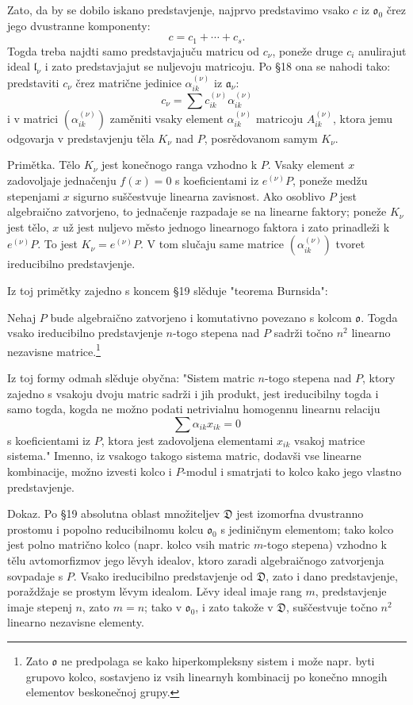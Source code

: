 \documentclass[11pt]{article}
\providecommand{\mo}{\mathfrak{o}}
\providecommand{\ma}{\mathfrak{a}}
\providecommand{\ml}{\mathfrak{l}}
\providecommand{\mD}{\mathfrak{D}}
\begin{document}
Zato, da by se dobilo iskano predstavjenje, najprvo predstavimo vsako $c$ iz $\mo_0$ črez jego dvustranne komponenty:
\[
        c=c_1+\cdots+c_s.
\]
Togda treba najdti samo predstavjajuču matricu od $c_\nu$, poneže druge $c_i$ anulirajut ideal $\ml_\nu$ i zato predstavjajut se nuljevoju matricoju. Po §18 ona se nahodi tako: predstaviti $c_\nu$ črez matrične jedinice $\alpha_{ik}^{(\nu)}$ iz $\ma_\nu$:
\[
        c_\nu=\sum c_{ik}^{(\nu)}\alpha_{ik}^{(\nu)}
\]
i v matrici $(\alpha_{ik}^{(\nu)})$ zaměniti vsaky element $\alpha_{ik}^{(\nu)}$ matricoju $A_{ik}^{(\nu)}$, ktora jemu odgovarja v predstavjenju těla $K_\nu$ nad $P$, posrědovanom samym $K_\nu$.

Primětka. Tělo $K_\nu$ jest konečnogo ranga vzhodno k $P$. Vsaky element $x$ zadovoljaje jednačenju $f(x)=0$ s koeficientami iz $e^{(\nu)}P$, poneže medžu stepenjami $x$ sigurno suščestvuje linearna zavisnost. Ako osoblivo $P$ jest algebraično zatvorjeno, to jednačenje razpadaje se na linearne faktory; poneže $K_\nu$ jest tělo, $x$ už jest nuljevo město jednogo linearnogo faktora i zato prinadleži k $e^{(\nu)}P$. To jest $K_\nu=e^{(\nu)}P$. V tom slučaju same matrice $(\alpha_{ik}^{(\nu)})$ tvoret ireducibilno predstavjenje.

Iz toj primětky zajedno s koncem §19 slěduje "teorema Burnsida":

Nehaj $P$ bude algebraično zatvorjeno i komutativno povezano s kolcom $\mo$. Togda vsako ireducibilno predstavjenje $n$-togo stepena nad $P$ sadrži točno $n^2$ linearno nezavisne matrice.\footnote{Zato $\mo$ ne predpolaga se kako hiperkompleksny sistem i može napr. byti grupovo kolco, sostavjeno iz vsih linearnyh kombinacij po konečno mnogih elementov beskonečnoj grupy.}

Iz toj formy odmah slěduje obyčna: "Sistem matric $n$-togo stepena nad $P$, ktory zajedno s vsakoju dvoju matric sadrži i jih produkt, jest ireducibilny togda i samo togda, kogda ne možno podati netrivialnu homogennu linearnu relaciju
\[
        \sum \alpha_{ik}x_{ik}=0
\]
s koeficientami iz $P$, ktora jest zadovoljena elementami $x_{ik}$ vsakoj matrice sistema." Imenno, iz vsakogo takogo sistema matric, dodavši vse linearne kombinacije, možno izvesti kolco i $P$-modul i smatrjati to kolco kako jego vlastno predstavjenje.

Dokaz. Po §19 absolutna oblast množiteljev $\mD$ jest izomorfna dvustranno prostomu i popolno reducibilnomu kolcu $\mo_0$ s jediničnym elementom; tako kolco jest polno matrično kolco (napr. kolco vsih matric $m$-togo stepena) vzhodno k tělu avtomorfizmov jego lěvyh idealov, ktoro zaradi algebraičnogo zatvorjenja sovpadaje s $P$. Vsako ireducibilno predstavjenje od $\mD$, zato i dano predstavjenje, poraždžaje se prostym lěvym idealom. Lěvy ideal imaje rang $m$, predstavjenje imaje stepenj $n$, zato $m=n$; tako v $\mo_0$, i zato takože v $\mD$, suščestvuje točno $n^2$ linearno nezavisne elementy.
\end{document}
